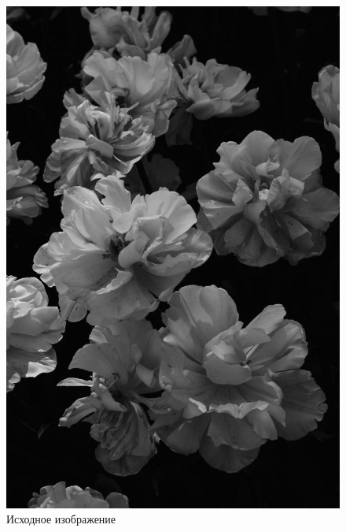 \begin{figure}[!htb]
	\begin{minipage}{0.5\textwidth}
		\centering
		\includegraphics[scale=0.16]{assets/flowers_gray}
		\caption{Исходное изображение}\label{flowers}
	\end{minipage}\hfill
	\begin{minipage}{0.5\textwidth}
		\centering

\end{minipage}
\end{figure}
